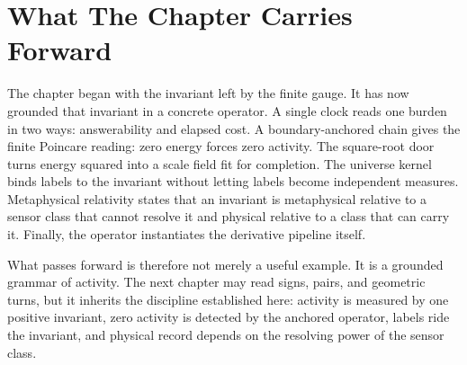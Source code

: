 \section{What The Chapter Carries Forward}

The chapter began with the invariant left by the finite gauge. It has now
grounded that invariant in a concrete operator. A single clock reads one
burden in two ways: answerability and elapsed cost. A boundary-anchored
chain gives the finite Poincare reading: zero energy forces zero activity.
The square-root door turns energy squared into a scale field fit for
completion. The universe kernel binds labels to the invariant without
letting labels become independent measures. Metaphysical relativity states
that an invariant is metaphysical relative to a sensor class that cannot
resolve it and physical relative to a class that can carry it. Finally, the
operator instantiates the derivative pipeline itself.

What passes forward is therefore not merely a useful example. It is a
grounded grammar of activity. The next chapter may read signs, pairs, and
geometric turns, but it inherits the discipline established here: activity
is measured by one positive invariant, zero activity is detected by the
anchored operator, labels ride the invariant, and physical record depends on
the resolving power of the sensor class.
